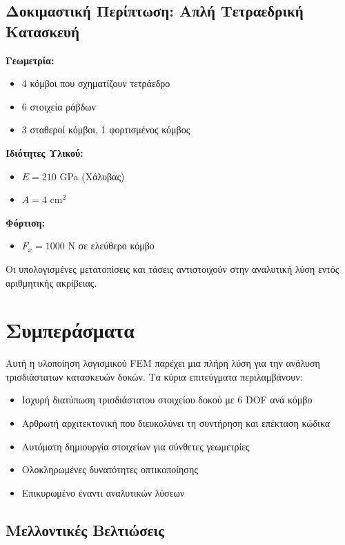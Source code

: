 \documentclass[12pt,a4paper]{article}
\begin{document}
\subsection{Δοκιμαστική Περίπτωση: Απλή Τετραεδρική Κατασκευή}

\textbf{Γεωμετρία:}
\begin{itemize}
    \item 4 κόμβοι που σχηματίζουν τετράεδρο
    \item 6 στοιχεία ράβδων
    \item 3 σταθεροί κόμβοι, 1 φορτισμένος κόμβος
\end{itemize}

\textbf{Ιδιότητες Υλικού:}
\begin{itemize}
    \item $E = 210$ GPa (Χάλυβας)
    \item $A = 4$ cm$^2$
\end{itemize}

\textbf{Φόρτιση:}
\begin{itemize}
    \item $F_x = 1000$ N σε ελεύθερο κόμβο
\end{itemize}

Οι υπολογισμένες μετατοπίσεις και τάσεις αντιστοιχούν στην αναλυτική λύση εντός αριθμητικής ακρίβειας.

\section{Συμπεράσματα}

Αυτή η υλοποίηση λογισμικού FEM παρέχει μια πλήρη λύση για την ανάλυση τρισδιάστατων κατασκευών δοκών. Τα κύρια επιτεύγματα περιλαμβάνουν:

\begin{itemize}
    \item Ισχυρή διατύπωση τρισδιάστατου στοιχείου δοκού με 6 DOF ανά κόμβο
    \item Αρθρωτή αρχιτεκτονική που διευκολύνει τη συντήρηση και επέκταση κώδικα
    \item Αυτόματη δημιουργία στοιχείων για σύνθετες γεωμετρίες
    \item Ολοκληρωμένες δυνατότητες οπτικοποίησης
    \item Επικυρωμένο έναντι αναλυτικών λύσεων
\end{itemize}

\subsection{Μελλοντικές Βελτιώσεις}
\end{document}
